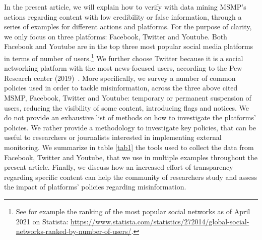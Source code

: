 \documentclass{article}
\begin{document}
In the present article, we will explain how to verify with data mining MSMP's actions regarding content with low credibility or false information, through a series of examples for different actions and platforms. For the purpose of clarity, we only focus on three platforms: Facebook, Twitter and Youtube. Both Facebook and Youtube are in the top three most popular social media platforms in terms of number of users.\footnote{See for example the ranking of the most popular social networks as of April 2021 on Statista: \href{https://www.statista.com/statistics/272014/global-social-networks-ranked-by-number-of-users/}{https://www.statista.com/statistics/272014/global-social-networks-ranked-by-number-of-users/}.} We further choose Twitter because it is a social networking platform with the most news-focused users, according to the Pew Research center (2019)~\cite{pew1}. More specifically, we survey a number of common policies used in order to tackle misinformation, across the three above cited MSMP, Facebook, Twitter and Youtube: temporary or permanent suspension of users, reducing the visibility of some content, introducing flags and notices. We do not provide  an exhaustive list of methods on how to investigate the platforms’ policies. We rather provide a methodology to investigate key policies, that can be useful to researchers or journalists interested in implementing external monitoring. We summarize in table \ref{tab1} the tools used to collect the data from Facebook, Twitter and Youtube, that we use in multiple examples throughout the present article. Finally, we discuss how an increased effort of transparency regarding specific content can help the community of researchers study and assess the impact of platforms' policies regarding misinformation.  %




\end{document}
